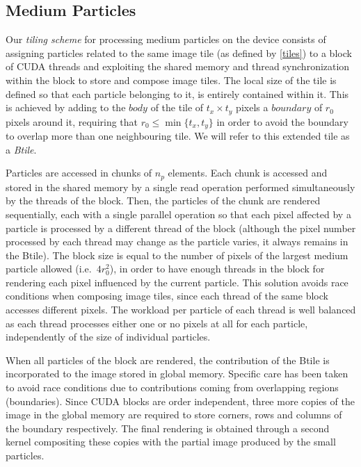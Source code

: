 \documentclass[preprint,5pt]{elsarticle}
\begin{document}
\subsection{Medium Particles}
\label{sec:mediumparticles}
Our \textit{tiling scheme} for processing medium particles on the device consists of assigning particles related to the same image tile (as defined by \eqref{tiles}) to a block of CUDA threads and exploiting  the shared memory and thread synchronization within the block to store and compose image tiles. The local size of the tile is defined so that each particle belonging to it, is entirely contained within it. This is achieved by adding to the $body$ of the tile of $t_x \times t_y$ pixels a $boundary$ of $r_0$ pixels around it, requiring that $r_0 \le \min\{t_x, t_y\}$ in order to avoid the boundary to overlap more than one neighbouring tile. We will refer to this extended tile as a \textit{Btile}.

Particles are accessed in chunks of $n_p$ elements. Each chunk is accessed and stored in the shared memory by a single read operation performed simultaneously by the threads of the block. Then, the particles of the chunk are rendered sequentially, each with a single parallel operation so that each pixel affected by a particle is processed by a different thread of the block (although the pixel number processed by each thread may change as the particle varies, it always remains in the Btile). The block size is equal to the number of pixels of the largest medium particle allowed (i.e.~$4r_0^2$), in order to have enough threads in the block for rendering each pixel influenced by the current particle. 
This solution avoids race conditions when composing image tiles, since each
thread of the same block accesses different pixels. The workload per particle of each
thread is well balanced as each thread processes either one or no pixels at all for each particle, independently of the size of individual particles.

When all particles of the block are rendered, the contribution of the Btile is incorporated to the image stored in global memory. Specific care has been taken to avoid race conditions due to contributions coming
from overlapping regions (boundaries). Since CUDA blocks are order independent, three more copies of the image in the global memory are required to store corners, rows and columns of the boundary respectively. The final rendering is obtained through a second kernel compositing these copies with the partial image produced by the small particles.  
\end{document}
